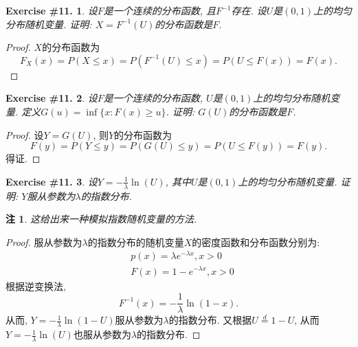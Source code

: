 \documentclass[UTF8, a4paper]{article}
\newtheorem{exercise}{Exercise \#11.}
\newtheorem*{remark}{注}
\begin{document}
\begin{framed}
\begin{exercise}
设\(F\)是一个连续的分布函数, 且\(F^{-1}\)存在. 设\(U\)是\((0,1)\)上的均匀分布随机变量. 证明: \(X = F^{-1}(U)\)的分布函数是\(F\).
\end{exercise}
\end{framed}

\begin{proof}
\(X\)的分布函数为
$$
F_X(x) = P(X \leq x) = P(F^{-1}(U) \leq x) = P(U \leq F(x)) = F(x).
$$
\end{proof}

\begin{framed}
\begin{exercise}
设\(F\)是一个连续的分布函数, \(U\)是\((0,1)\)上的均匀分布随机变量. 定义\(G(u) = \inf\{x: F(x) \geq u\}\). 证明: \(G(U)\)的分布函数是\(F\).
\end{exercise}
\end{framed}

\begin{proof}
设\(Y = G(U)\), 则\(Y\)的分布函数为
$$
F(y) = P(Y \leq y) = P(G(U) \leq y) = P(U \leq F(y)) = F(y).
$$
得证.
\end{proof}


\begin{framed}
\begin{exercise}
设\(Y = -\frac{1}{\lambda} \ln(U)\), 其中\(U\)是\((0,1)\)上的均匀分布随机变量. 证明: \(Y\)服从参数为\(\lambda\)的指数分布.
\end{exercise}
\end{framed}
\begin{remark}
这给出来一种模拟指数随机变量的方法.
\end{remark}


\begin{proof}
    服从参数为\(\lambda\)的指数分布的随机变量\(X\)的密度函数和分布函数分别为:
$$
\begin{aligned}
& p(x)=\lambda e^{-\lambda x}, x>0 \\
& F(x)=1-e^{-\lambda x}, x>0
\end{aligned}
$$
根据逆变换法, 
$$
F^{-1}(x) = -\frac{1}{\lambda} \ln(1-x).
$$
从而, \(Y = -\frac{1}{\lambda} \ln(1- U)\)服从参数为\(\lambda\)的指数分布.
又根据\(U \overset{d}{=} 1-U\), 从而\(Y = -\frac{1}{\lambda} \ln(U)\)也服从参数为\(\lambda\)的指数分布.
\end{proof}


\end{document}
